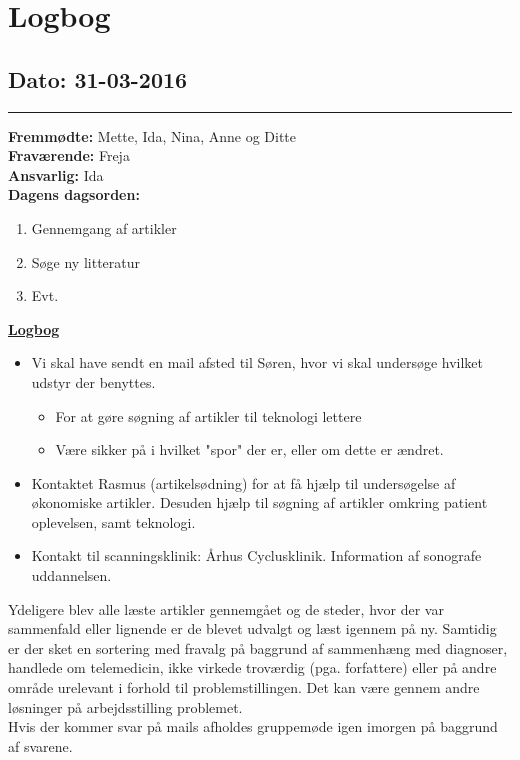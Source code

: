 \chapter{Logbog}
\section{Dato: 31-03-2016}
\hrule
\textbf{Fremmødte:} Mette, Ida, Nina, Anne og Ditte \\
\textbf{Fraværende:} Freja  \\
\textbf{Ansvarlig:} Ida  \\
\textbf{Dagens dagsorden: }
\begin{enumerate}
	\item Gennemgang af artikler
	\item Søge ny litteratur
	\item Evt. 
\end{enumerate}

\underline{\textbf{Logbog}}
\begin{itemize}
\item Vi skal have sendt en mail afsted til Søren, hvor vi skal undersøge hvilket udstyr der benyttes.
\begin{itemize}
\item For at gøre søgning af artikler til teknologi lettere
\item Være sikker på i hvilket "spor" der er, eller om dette er ændret.
\end{itemize}
\item Kontaktet Rasmus (artikelsødning) for at få hjælp til undersøgelse af økonomiske artikler. Desuden hjælp til søgning af artikler omkring patient oplevelsen, samt teknologi. 
\item Kontakt til scanningsklinik: Århus Cyclusklinik. Information af sonografe uddannelsen. 
\end{itemize}

Ydeligere blev alle læste artikler gennemgået og de steder, hvor der var sammenfald eller lignende er de blevet udvalgt og læst igennem på ny. Samtidig er der sket en sortering med fravalg på baggrund af sammenhæng med diagnoser, handlede om telemedicin, ikke virkede troværdig (pga. forfattere) eller på andre område urelevant i forhold til problemstillingen. Det kan være gennem andre løsninger på arbejdsstilling problemet.  \\
\newline
Hvis der kommer svar på mails afholdes gruppemøde igen imorgen på baggrund af svarene. 
\newpage
